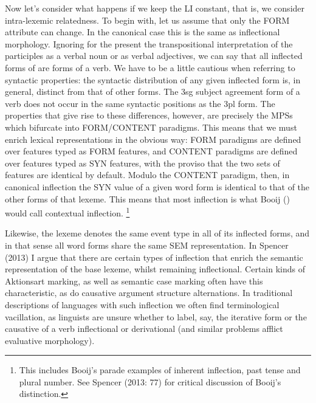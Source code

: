 \documentclass[output=paper,
modfonts
]{LSP/langsci}
\begin{document}
Now let’s consider what happens if we keep the LI constant, that is, we consider intra-lexemic relatedness. To begin with, let us assume that only the FORM attribute can change. In the canonical case this is the same as inflectional morphology.  Ignoring for the present the transpositional interpretation of the participles as a verbal noun or as verbal adjectives, we can  say that all inflected forms of  are forms of a verb. We have to be a little cautious when referring to syntactic properties: the syntactic distribution of any given inflected form is, in general, distinct from that of other forms. The 3sg subject agreement form of a verb does not occur in the same syntactic positions as the 3pl form. The properties that give rise to these differences, however, are precisely the MPSs which bifurcate into FORM/CONTENT paradigms. This means that we must enrich lexical representations in the obvious way: FORM paradigms are defined over features typed as FORM features, and CONTENT paradigms are defined over features typed as SYN features, with the proviso that the two sets of features are identical by default. Modulo the CONTENT paradigm, then, in canonical inflection the SYN value of a given word form is identical to that of the other forms of that lexeme. This means that most inflection is what Booij (\citeyear*{Booij94}) would call contextual inflection.%
\footnote{This includes Booij’s parade examples of inherent inflection, past tense and plural number. See Spencer (2013: 77) for critical discussion of Booij’s distinction.} %

Likewise, the lexeme  denotes the same event type in all of its inflected forms, and in that sense all word forms share the same SEM representation. In Spencer (2013) I argue that there are certain types of inflection that enrich the semantic representation of the base lexeme, whilst remaining inflectional. Certain kinds of Aktionsart marking, as well as semantic case marking often have this characteristic, as do causative argument structure alternations.  In traditional descriptions of languages with such inflection we often find terminological vacillation, as linguists are unsure whether to label, say, the iterative form or the causative of a verb inflectional or derivational (and similar problems afflict evaluative morphology). 
\end{document}
